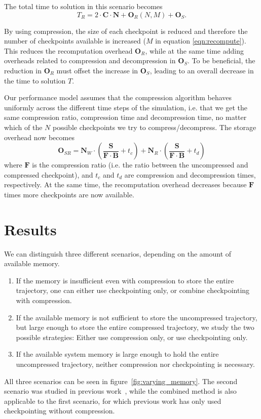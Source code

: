 \documentclass[conference]{IEEEtran}
\begin{document}
The total time to solution in this scenario becomes
\begin{equation}
T_R = 2 \cdot \mathbf{C} \cdot \mathbf{N} + \mathbf{O}_R(N, M) + \mathbf{O}_S.
\end{equation}

By using compression, the size of each checkpoint is reduced and therefore the
number of checkpoints available is increased ($M$ in equation
\ref{eqn:recompute}). This reduces the recomputation overhead $\mathbf{O}_R$,
while at the same time adding overheads related to compression and decompression
in $\mathbf{O}_S$.
To be beneficial, the reduction in $\mathbf{O}_R$ must offset the increase in 
$\mathbf{O}_S$, leading to an overall decrease in the time to solution $T$.

Our performance model assumes
 that the compression algorithm behaves uniformly
across the different time steps of the simulation, i.e. that we get the same compression ratio, compression time and 
decompression time, no matter which of the $N$ possible checkpoints we try to compress/decompress. The storage overhead
now becomes
\begin{equation}
\mathbf{O}_{SR} = \mathbf{N}_W \cdot \left(\frac{\mathbf{S}}{\mathbf{F}
  \cdot \mathbf{B}} + t_c\right) + \mathbf{N}_R \cdot
\left(\frac{\mathbf{S}}{\mathbf{F} \cdot \mathbf{B}} + t_d\right)
\end{equation}
where $\mathbf{F}$ is the compression ratio (i.e. the ratio between the uncompressed and compressed checkpoint), and $t_c$
and $t_d$ are compression and decompression times, respectively. At the same
time, the recomputation overhead decreases
because $\mathbf{F}$ times more checkpoints are now available.

\section{Results}
We can distinguish three different scenarios, depending on the amount of
available memory.
\begin{enumerate}
\item If the memory is insufficient even with compression to store the entire
trajectory, one can either use checkpointing only, or combine checkpointing with
compression.
\item If the available memory is not sufficient to store the uncompressed
trajectory, but large enough to store the entire compressed trajectory, we study
the two possible strategies: Either use compression only, or use checkpointing
only.
\item If the available system memory is large enough to hold the entire
uncompressed trajectory, neither compression nor checkpointing is necessary.
\end{enumerate}
All three scenarios can be seen in figure~\ref{fig:varying_memory}.
The second scenario was studied in previous work~\cite{cyr2015towards}, while
the combined method is also applicable to the first scenario, for which previous
work has only used checkpointing without compression.
\end{document}
